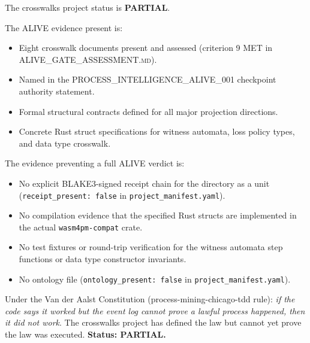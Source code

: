 The crosswalks project status is \textbf{PARTIAL}.

The ALIVE evidence present is:
\begin{itemize}
  \item Eight crosswalk documents present and assessed (criterion 9 MET in
        \textsc{ALIVE\_GATE\_ASSESSMENT.md}).
  \item Named in the \textsc{PROCESS\_INTELLIGENCE\_ALIVE\_001} checkpoint authority statement.
  \item Formal structural contracts defined for all major projection directions.
  \item Concrete Rust struct specifications for witness automata, loss policy types, and
        data type crosswalk.
\end{itemize}

The evidence preventing a full ALIVE verdict is:
\begin{itemize}
  \item No explicit \textsc{BLAKE3}-signed receipt chain for the directory as a unit
        (\texttt{receipt\_present: false} in \texttt{project\_manifest.yaml}).
  \item No compilation evidence that the specified Rust structs are implemented in the actual
        \texttt{wasm4pm-compat} crate.
  \item No test fixtures or round-trip verification for the witness automata step functions or
        data type constructor invariants.
  \item No ontology file (\texttt{ontology\_present: false} in \texttt{project\_manifest.yaml}).
\end{itemize}

Under the Van der Aalst Constitution (process-mining-chicago-tdd rule): \emph{if the code says
it worked but the event log cannot prove a lawful process happened, then it did not work}. The
crosswalks project has defined the law but cannot yet prove the law was executed.
\textbf{Status: PARTIAL.}
